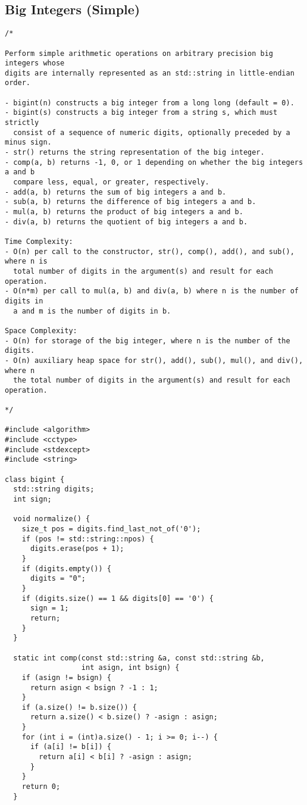 \subsection{Big Integers (Simple)}
\begin{lstlisting}
/*

Perform simple arithmetic operations on arbitrary precision big integers whose
digits are internally represented as an std::string in little-endian order.

- bigint(n) constructs a big integer from a long long (default = 0).
- bigint(s) constructs a big integer from a string s, which must strictly
  consist of a sequence of numeric digits, optionally preceded by a minus sign.
- str() returns the string representation of the big integer.
- comp(a, b) returns -1, 0, or 1 depending on whether the big integers a and b
  compare less, equal, or greater, respectively.
- add(a, b) returns the sum of big integers a and b.
- sub(a, b) returns the difference of big integers a and b.
- mul(a, b) returns the product of big integers a and b.
- div(a, b) returns the quotient of big integers a and b.

Time Complexity:
- O(n) per call to the constructor, str(), comp(), add(), and sub(), where n is
  total number of digits in the argument(s) and result for each operation.
- O(n*m) per call to mul(a, b) and div(a, b) where n is the number of digits in
  a and m is the number of digits in b.

Space Complexity:
- O(n) for storage of the big integer, where n is the number of the digits.
- O(n) auxiliary heap space for str(), add(), sub(), mul(), and div(), where n
  the total number of digits in the argument(s) and result for each operation.

*/

#include <algorithm>
#include <cctype>
#include <stdexcept>
#include <string>

class bigint {
  std::string digits;
  int sign;

  void normalize() {
    size_t pos = digits.find_last_not_of('0');
    if (pos != std::string::npos) {
      digits.erase(pos + 1);
    }
    if (digits.empty()) {
      digits = "0";
    }
    if (digits.size() == 1 && digits[0] == '0') {
      sign = 1;
      return;
    }
  }

  static int comp(const std::string &a, const std::string &b,
                  int asign, int bsign) {
    if (asign != bsign) {
      return asign < bsign ? -1 : 1;
    }
    if (a.size() != b.size()) {
      return a.size() < b.size() ? -asign : asign;
    }
    for (int i = (int)a.size() - 1; i >= 0; i--) {
      if (a[i] != b[i]) {
        return a[i] < b[i] ? -asign : asign;
      }
    }
    return 0;
  }


\end{lstlisting}
